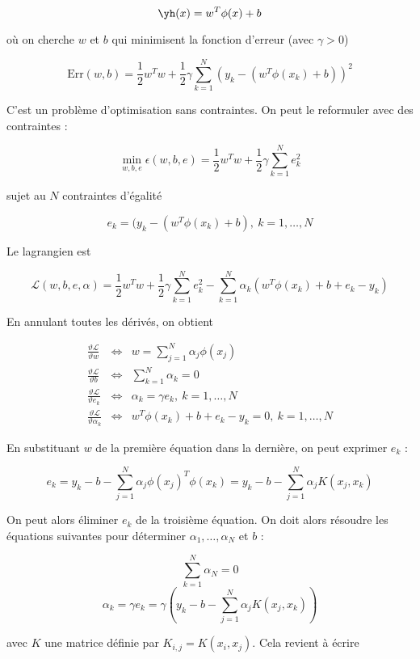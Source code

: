 $$\yh(x) = w^T \phi(x) + b$$

où on cherche $w$ et $b$ qui minimisent la fonction d'erreur (avec $\gamma > 0$)

$$\text{Err}(w, b) = \frac{1}{2} w^T w + \frac{1}{2} \gamma \sum_{k = 1}^N (y_k - (w^T \phi(x_k) + b))^2$$

C'est un problème d'optimisation sans contraintes. On peut le reformuler avec des contraintes :

$$\min_{w, b, e} \epsilon(w,b,e) = \frac{1}{2} w^T w + \frac{1}{2} \gamma \sum_{k = 1}^N e_k^2$$

sujet au $N$ contraintes d'égalité

$$e_k = (y_k - (w^T \phi(x_k) + b), \: k = 1, \dots , N$$

Le lagrangien est

$$\mathcal{L}(w, b, e, \alpha) = \frac{1}{2} w^T w + \frac{1}{2} \gamma \sum_{k = 1}^N e_k^2 - \sum_{k = 1}^N \alpha_k (w^T \phi(x_k) + b + e_k - y_k)$$

En annulant toutes les dérivés, on obtient

\begin{eqnarray*}
\frac{\vartheta \mathcal{L}}{\vartheta w} & \Leftrightarrow & w = \sum_{j = 1}^N \alpha_j \phi(x_j) \\
\frac{\vartheta \mathcal{L}}{\vartheta b} & \Leftrightarrow & \sum_{k = 1}^N \alpha_k = 0 \\
\frac{\vartheta \mathcal{L}}{\vartheta e_k} & \Leftrightarrow & \alpha_k = \gamma e_k , \: k = 1, \dots , N\\
\frac{\vartheta \mathcal{L}}{\vartheta \alpha_k} & \Leftrightarrow &  w^T \phi(x_k) + b + e_k - y_k = 0, \: k = 1, \dots , N
\end{eqnarray*}

En substituant $w$ de la première équation dans la dernière, on peut exprimer $e_k$ :

$$e_k = y_k - b - \sum_{j = 1}^N \alpha_j \phi(x_j)^T\phi(x_k) = y_k - b - \sum_{j = 1}^N \alpha_j K(x_j, x_k)$$

On peut alors éliminer $e_k$ de la troisième équation. On doit alors résoudre les équations suivantes pour déterminer $\alpha_1, \dots , \alpha_N$ et $b$ :

$$\sum_{k = 1}^N \alpha_N = 0$$
$$\alpha_k = \gamma e_k = \gamma (y_k - b - \sum_{j = 1}^N \alpha_j K(x_j, x_k))$$

avec $K$ une matrice définie par $K_{i, j} = K(x_i, x_j)$. Cela revient à écrire

